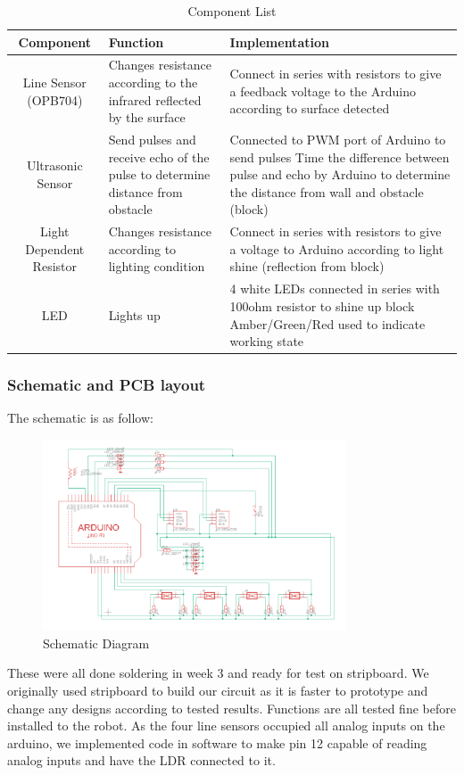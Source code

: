 \documentclass{article}
\begin{document}
\begin{table}[!h]
    \centering
    \begin{tabular}{|c|p{5cm}|p{5cm}|}
\hline
Component &
  Function &
  Implementation
   \\
   \hline
Line Sensor (OPB704) &
  Changes resistance according to the infrared reflected by the surface &
  Connect in series with resistors to give a feedback voltage to the Arduino according to surface detected
   \\
   \hline
Ultrasonic Sensor &
  Send pulses and receive echo of the pulse to determine distance from obstacle &
Connected to PWM port of Arduino to send pulses  Time the difference between pulse and echo by Arduino to determine the distance from wall and obstacle (block)
   \\
   \hline
Light Dependent Resistor &
  Changes resistance according to lighting condition &
  Connect in series with resistors   to give a voltage to Arduino according to light shine (reflection from block) 
   \\
   \hline
LED &
  Lights up &
4 white LEDs connected in series with 100ohm resistor to shine up block Amber/Green/Red used to indicate   working state\\
  \hline
    \end{tabular}
    \caption{Component List}
    \label{tab:mount_sens}
\end{table}

\subsubsection{Schematic and PCB layout}
\quad The schematic is as follow:

\begin{figure}[!h]
    \centering
    \includegraphics[width=0.8\textwidth]{assets/Schematic.png}
    \caption{Schematic Diagram}
    \label{fig:sche}
\end{figure}
These were all done soldering in week 3 and ready for test on stripboard. We originally used stripboard to build our circuit as it is faster to prototype and change any designs according to tested results. Functions are all tested fine before installed to the robot.
As the four line sensors occupied all analog inputs on the arduino, we implemented code in software to make pin 12 capable of  reading analog inputs and have the LDR connected to it.
\end{document}
